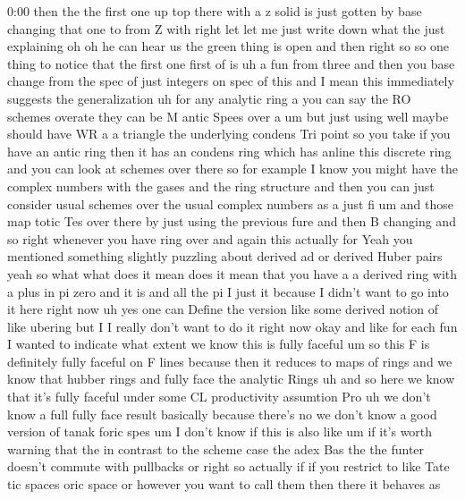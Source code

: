 \begin{unfinished}{0:00}
then
the  the  first  one  up  top  there  with  a  z
solid  is  just  gotten  by  base  changing
that  one  to  from  Z  with  right  let  let  me
just  write  down  what  the  just  explaining
oh  oh  he  can  hear  us
the  green  thing  is  open  and
then  right  so  so  one  thing  to  notice
that  the  first  one  first
of
is
uh  a  fun  from
three  and  then  you  base  change  from  the
spec  of  just
integers  on  spec  of
this  and  I  mean  this  immediately
suggests  the
generalization  uh  for  any  analytic  ring
a  you  can  say  the  RO  schemes  overate
they  can  be  M  antic  Spees  over
a  um  but  just
using  well  maybe  should  have  WR
a  a  triangle  the  underlying
condens  Tri  point  so  you  take  if  you
have  an  antic  ring  then  it  has  an
condens  ring  which  has  anline  this
discrete  ring  and  you  can  look  at
schemes  over  there  so  for  example  I  know
you  might  have  the  complex  numbers  with
the  gases  and  the  ring  structure  and
then  you  can  just  consider  usual  schemes
over  the  usual  complex  numbers  as  a  just
fi  um  and  those  map  totic  Tes  over  there
by  just  using  the  previous  fure  and  then
B
changing  and
so  right  whenever  you  have  ring
over  and  again  this  actually  for
Yeah  you  mentioned  something  slightly
puzzling  about
derived  ad  or  derived  Huber  pairs  yeah
so  what  what  does  it  mean  does  it  mean
that  you  have  a  a  derived  ring  with  a
plus  in  pi  zero  and  it  is  and  all  the  pi
I  just  it  because  I  didn't  want  to  go
into  it  here  right  now  uh  yes  one  can
Define  the  version  like  some  derived
notion  of  like  ubering  but  I  I  really
don't  want  to  do  it  right  now  okay
and  like  for  each  fun  I  wanted  to
indicate  what  extent  we  know  this  is
fully
faceful  um  so  this  F  is  definitely  fully
faceful  on  F  lines  because  then  it
reduces  to  maps  of  rings  and  we  know
that  hubber  rings  and  fully  face  the
analytic  Rings
uh  and  so  here  we  know  that  it's  fully
faceful  under  some  CL  productivity
assumtion
Pro
uh  we  don't  know  a
full  fully  face  result  basically  because
there's  no  we  don't  know  a  good  version
of
tanak  foric
spes  um  I  don't  know  if  this  is  also
like  um  if  it's  worth  warning  that  the
in  contrast  to  the  scheme  case  the  adex
Bas  the  the  funter  doesn't  commute  with
pullbacks
or
right  so  actually  if  if  you  restrict  to
like  Tate  tic  spaces  oric  space  or
however  you  want  to  call  them  then  there
it  behaves  as

\end{unfinished}
